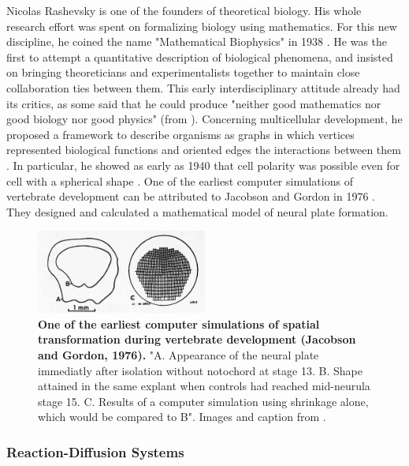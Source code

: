   Nicolas Rashevsky is one of the founders of theoretical biology. His whole research effort was spent on formalizing biology using mathematics. For this new discipline, he coined the name "Mathematical Biophysics" in 1938 \cite{Rashevsky:1938tf}. He was the first to attempt a quantitative description of biological phenomena, and insisted on bringing theoreticians and experimentalists together to maintain close collaboration ties between them. This early interdisciplinary attitude already had its critics, as some said that he could produce "neither good mathematics nor good biology nor good physics" (from \cite{Cull:2007ib}). Concerning multicellular development, he proposed a framework to describe organisms as graphs in which vertices represented biological functions and oriented edges the interactions between them \cite{Rashevsky:1954ws}. In particular, he showed as early as 1940 that cell polarity was possible even for cell with a spherical shape \cite{Rashevsky:1940uc}. One of the earliest computer simulations of vertebrate development can be attributed to Jacobson and Gordon in 1976 \cite{Jacobson:1976cc}. They designed and calculated a mathematical model of neural plate formation. 
\begin{figure}
\begin{center}
\includegraphics[width=0.5\textwidth]{../../images/biomechanics_sota/jacobson1976.png}
\end{center}
\caption{\textbf{One of the earliest computer simulations of spatial transformation during vertebrate development (Jacobson and Gordon, 1976).} "A. Appearance of the neural plate immediatly after isolation without notochord at stage 13. B. Shape attained in the same explant when controls had reached mid-neurula stage 15. C. Results of a computer simulation using shrinkage alone, which would be compared to B". Images and caption from \cite{Jacobson:1976cc}.}
\label{biomechanics_sota_jacobson1976}
\end{figure}

\subsubsection{Reaction-Diffusion Systems}

